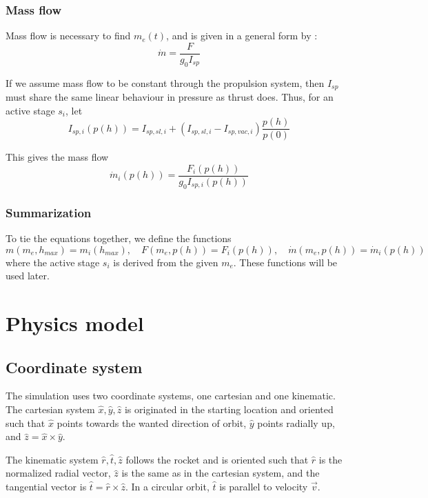 \documentclass[11pt]{article}
\begin{document}
\subsubsection{Mass flow}
% 
%
Mass flow is necessary to find $m_e(t)$, and is given in a general form by \cite{massflow}:
$$
\dot{m} = \frac{F}{ g_0 I_{sp}}
$$

If we assume mass flow to be constant through the propulsion system, then $I_{sp}$ must share the same linear behaviour in pressure as thrust does.
Thus, for an active stage $s_i$, let
$$
I_{sp,i}(p(h)) = I_{sp,sl,i} + \left( I_{sp,sl,i} - I_{sp,vac,i} \right) \frac{p(h)}{p(0)}
$$

This gives the mass flow
$$
\dot{m}_i(p(h)) = \frac{F_i(p(h))}{ g_0 I_{sp,i}(p(h))}
$$

\subsubsection{Summarization}
To tie the equations together, we define the functions
$$
m(m_e, h_{max}) = m_i(h_{max}), \quad 
F(m_e, p(h)) = F_i(p(h)), \quad 
\dot{m}(m_e, p(h)) = \dot{m}_i(p(h)) \quad 
$$
where the active stage $s_i$ is derived from the given $m_e$. These functions will be used later.

\section{Physics model}

\subsection{Coordinate system}
The simulation uses two coordinate systems, one cartesian and one kinematic.
The cartesian system $\hat{x}, \hat{y}, \hat{z}$ is originated in the starting location and oriented such that
$\hat{x}$ points towards the wanted direction of orbit,
$\hat{y}$ points radially up, and $\hat{z} = \hat{x} \times \hat{y}$.

The kinematic system $\hat{r}, \hat{t}, \hat{z}$ follows the rocket and is oriented such that 
$\hat{r}$ is the normalized radial vector, $\hat{z}$ is the same as in the cartesian system, 
and the tangential vector is $\hat{t} = \hat{r} \times \hat{z}$. In a circular orbit, $\hat{t}$ is parallel to velocity $\vec{v}$.
\end{document}
